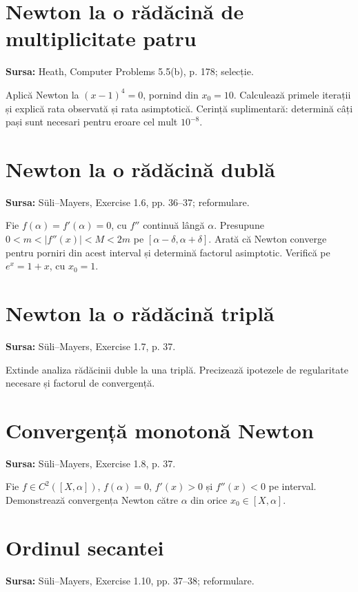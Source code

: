 \documentclass[11pt,a4paper]{article}
\begin{document}
\section{Newton la o rădăcină de multiplicitate patru}
\textbf{Sursa:} Heath, Computer Problems 5.5(b), p. 178; selecție.

Aplică Newton la $(x-1)^4=0$, pornind din $x_0=10$. Calculează primele iterații și explică rata observată și rata asimptotică. Cerință suplimentară: determină câți pași sunt necesari pentru eroare cel mult $10^{-8}$.



\section{Newton la o rădăcină dublă}
\textbf{Sursa:} Süli--Mayers, Exercise 1.6, pp. 36--37; reformulare.

Fie $f(\alpha)=f'(\alpha)=0$, cu $f''$ continuă lângă $\alpha$. Presupune $0<m<|f''(x)|<M<2m$ pe $[\alpha-\delta,\alpha+\delta]$. Arată că Newton converge pentru porniri din acest interval și determină factorul asimptotic. Verifică pe $e^x=1+x$, cu $x_0=1$.



\section{Newton la o rădăcină triplă}
\textbf{Sursa:} Süli--Mayers, Exercise 1.7, p. 37.

Extinde analiza rădăcinii duble la una triplă. Precizează ipotezele de regularitate necesare și factorul de convergență.



\section{Convergență monotonă Newton}
\textbf{Sursa:} Süli--Mayers, Exercise 1.8, p. 37.

Fie $f\in C^2([X,\alpha])$, $f(\alpha)=0$, $f'(x)>0$ și $f''(x)<0$ pe interval. Demonstrează convergența Newton către $\alpha$ din orice $x_0\in[X,\alpha]$.



\section{Ordinul secantei}
\textbf{Sursa:} Süli--Mayers, Exercise 1.10, pp. 37--38; reformulare.
\end{document}
